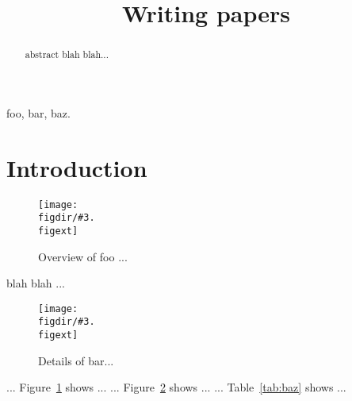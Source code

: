 \documentclass[10pt, conference, compsocconf]{IEEEtran}
\begin{document}
\title{Writing papers}
\author{
  }


\def\figdir{graphics}
\def\figext{pdf}

\newcommand{\insertfigure}[4][0.9]{
  \begin{figure}[tb]
    \begin{center}
      \vspace{1em}
      \texttt{[image: \\figdir/\#3.\\figext]}
      \caption{#4\label{#2}}
      \vspace{1em}
    \end{center}
  \end{figure}
}

\newcommand\figref[1]{Figure~\ref{#1}}
\newcommand\tabref[1]{Table~\ref{#1}}

\maketitle

\begin{abstract}
abstract blah blah...
\end{abstract}

\begin{IEEEkeywords}
  foo, bar, baz.
\end{IEEEkeywords}

\section{Introduction}\label{sec:introduction}

\insertfigure{fig:foo}{fig1}{Overview of foo ...}

blah blah ...

\insertfigure[0.9]{fig:bar}{fig2}{Details of bar...}

... \figref{fig:foo} shows ...
... \figref{fig:bar} shows ...
... \tabref{tab:baz} shows ...
\end{document}
